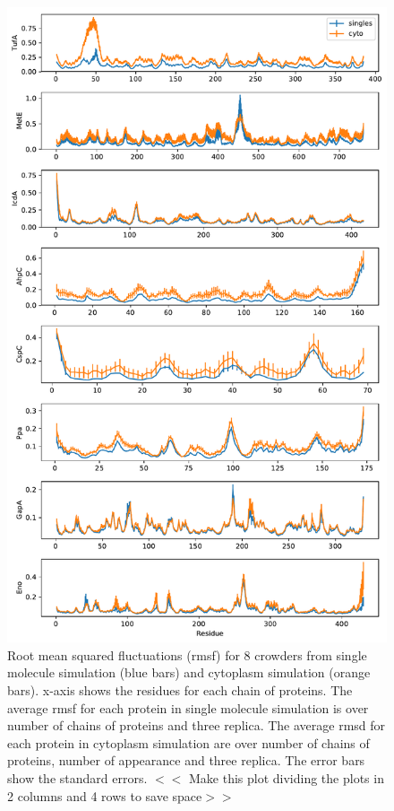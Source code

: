 \documentclass[journal=jacsat,manuscript=article]{achemso}
\begin{document}
\begin{figure}[H]
\includegraphics[scale=0.5]{rmsf.pdf}
\caption{Root mean squared fluctuations (rmsf) for 8 crowders from single molecule simulation (blue bars) and cytoplasm simulation (orange bars). x-axis shows the residues for each chain of proteins. The average rmsf for each protein in single molecule simulation is over number of chains of proteins and three replica. The average rmsd for each protein in cytoplasm simulation are over number of chains of proteins, number of appearance and three replica. The error bars show the standard errors. \colorbox{blue!50}{$<<$ Make this plot dividing the plots in 2 columns and 4 rows to save space$>>$}}
\label{fig:rmsf}
\end{figure}
\end{document}
